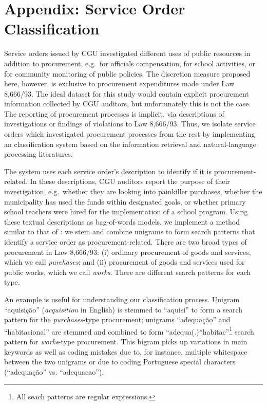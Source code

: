 \documentclass[11pt]{article}
\begin{document}
\appendix
\section{Appendix: Service Order Classification} \label{sec:appendixA}

Service orders issued by CGU investigated different uses of public resources in addition to procurement, e.g.~for officials compensation, for school activities, or for community monitoring of public policies. The discretion measure proposed here, however, is exclusive to procurement expenditures made under Law 8,666/93. The ideal dataset for this study would contain explicit procurement information collected by CGU auditors, but unfortunately this is not the case. The reporting of procurement processes is implicit, via descriptions of investigations or findings of violations to Law 8,666/93. Thus, we isolate service orders which investigated procurement processes from the rest by implementing an classification system based on the information retrieval and natural-language processing literatures.

The system uses each service order's description to identify if it is procurement-related. In these descriptions, CGU auditors report the purpose of their investigation, e.g.~whether they are looking into painkiller purchases, whether the municipality has used the funds within designated goals, or whether primary school teachers were hired for the implementation of a school program. Using these textual descriptions as bag-of-words models, we implement a method similar to that of \citet{HopkinsMethodAutomatedNonparametric2009}: we stem and combine unigrams to form search patterns that identify a service order as procurement-related. There are two broad types of procurement in Law 8,666/93: (i) ordinary procurement of goods and services, which we call \emph{purchases}; and (ii) procurement of goods and services used for public works, which we call \emph{works}. There are different search patterns for each type.

An example is useful for understanding our classification process. Unigram ``aquisição'' (\emph{acquisition} in English) is stemmed to ``aquisi'' to form a search pattern for the \emph{purchases}-type procurement; unigrams ``adequação'' and ``habitacional'' are stemmed and combined to form ``adequa(.)*habitac''\footnote{All seach patterns are regular expressions.} search pattern for \emph{works}-type procurement. This bigram picks up variations in main keywords as well as coding mistakes due to, for instance, multiple whitespace between the two unigrams or due to coding Portuguese special characters (``adequação'' vs. ``adequacao'').
\end{document}
